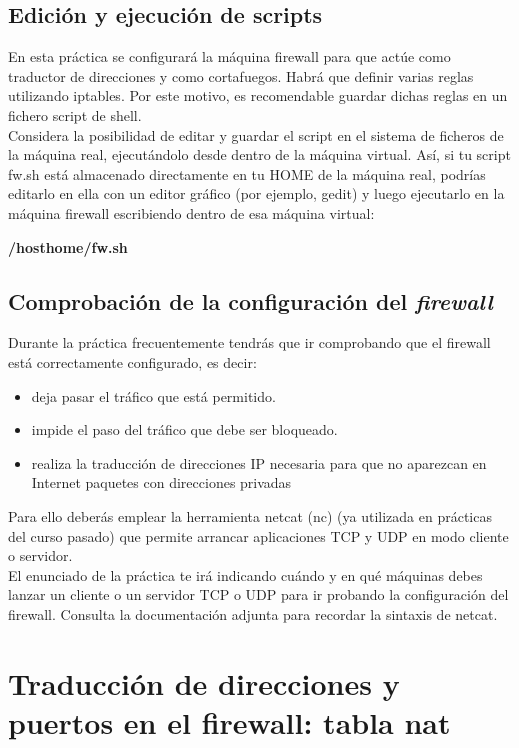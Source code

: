 \documentclass[12pt, a4paper]{report}
\begin{document}
\section{Edición y ejecución de scripts}
En esta práctica se configurará la máquina firewall para que actúe como traductor de direcciones y como cortafuegos. Habrá que definir varias reglas utilizando iptables. Por este motivo, es
recomendable guardar dichas reglas en un fichero script de shell.\\

Considera la posibilidad de editar y guardar el script en el sistema de ficheros de la máquina real,
ejecutándolo desde dentro de la máquina virtual. Así, si tu script fw.sh está almacenado directamente
en tu HOME de la máquina real, podrías editarlo en ella con un editor gráfico (por ejemplo, gedit) y
luego ejecutarlo en la máquina firewall escribiendo dentro de esa máquina virtual:
\begin{center}
\textbf{/hosthome/fw.sh}
\end{center}

\section{Comprobación de la configuración del \textit{firewall}}
Durante la práctica frecuentemente tendrás que ir comprobando que el firewall está correctamente
configurado, es decir:
\begin{itemize}
	\item deja pasar el tráfico que está permitido.
	\item impide el paso del tráfico que debe ser bloqueado.
	\item realiza la traducción de direcciones IP necesaria para que no aparezcan en Internet paquetes con
	direcciones privadas
\end{itemize}
Para ello deberás emplear la herramienta netcat (nc) (ya utilizada en prácticas del curso pasado)
que permite arrancar aplicaciones TCP y UDP en modo cliente o servidor.\\

El enunciado de la práctica te irá indicando cuándo y en qué máquinas debes lanzar un cliente o
un servidor TCP o UDP para ir probando la configuración del firewall. Consulta la documentación
adjunta para recordar la sintaxis de netcat.\\

\chapter{Traducción de direcciones y puertos en el firewall: tabla nat}
\end{document}
